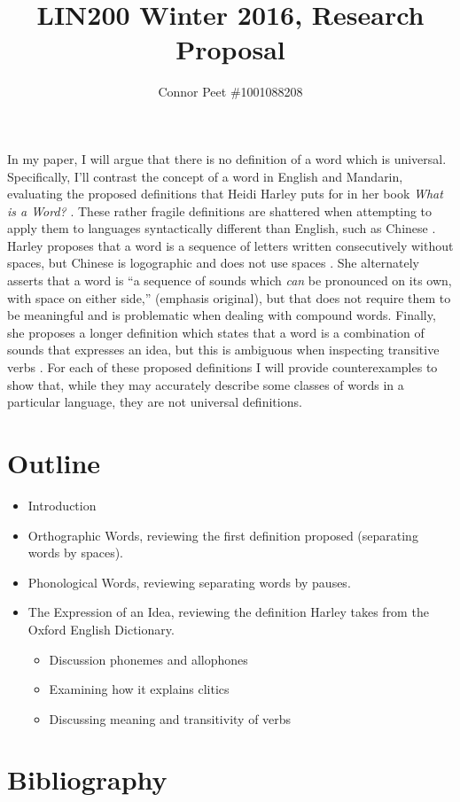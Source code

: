 \documentclass{article}
\title{LIN200 Winter 2016, Research Proposal}
\author{Connor Peet \#1001088208}
\begin{document}
\maketitle

In my paper, I will argue that there is no definition of a word which is universal. Specifically, I'll contrast the concept of a word in English and Mandarin, evaluating the proposed definitions that Heidi Harley puts for in her book \textit{What is a Word?} \cite{words}. These rather fragile definitions are shattered when attempting to apply them to languages syntactically different than English, such as Chinese \cite{mandarin}. Harley proposes that a word is a sequence of letters written consecutively without spaces, but Chinese is logographic and does not use spaces \cite{mandarin}. She alternately asserts that a word is ``a sequence of sounds which \textit{can} be pronounced on its own, with space on either side,'' (emphasis original), but that does not require them to be meaningful and is problematic when dealing with compound words. Finally, she proposes a longer definition which states that a word is a combination of sounds that expresses an idea, but this is ambiguous when inspecting transitive verbs \cite{chtrans}. For each of these proposed definitions I will provide counterexamples to show that, while they may accurately describe some classes of words in a particular language, they are not universal definitions.

\section{Outline}

\begin{itemize}
\item Introduction
\item Orthographic Words, reviewing the first definition proposed (separating words by spaces).
\item Phonological Words, reviewing separating words by pauses.
\item The Expression of an Idea, reviewing the definition Harley takes from the Oxford English Dictionary.
    \begin{itemize}
    \item Discussion phonemes and allophones
    \item Examining how it explains clitics
    \item Discussing meaning and transitivity of verbs
    \end{itemize}
\end{itemize}

\section{Bibliography}

\printbibliography
\end{document}
